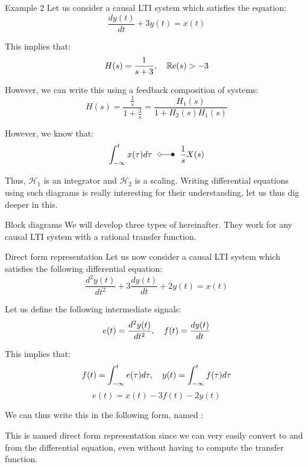 \documentclass[a4paper]{article}
\begin{document}
\begin{parag}{Example 2}
    Let us consider a causal LTI system which satisfies the equation: 
    \[\frac{dy\left(t\right)}{dt} + 3y\left(t\right) = x\left(t\right)\]
    
    This implies that: 
    \[H\left(s\right) = \frac{1}{s+3}, \mathspace \cre\left(s\right) > -3\]
    
    However, we can write this using a feedback composition of systems: 
    \[H\left(s\right) = \frac{\frac{1}{s}}{1 + \frac{3}{s}} = \frac{H_1\left(s\right)}{1 + H_2\left(s\right)H_1\left(s\right)}\]
    

    However, we know that: 
    \[\int_{-\infty}^{t} x\left(\tau\right)d\tau \laplacepair \frac{1}{s}X\left(s\right)\]
    
    Thus, $\mathcal{H}_1$ is an integrator and $\mathcal{H}_2$ is a scaling. Writing differential equations using such diagrams is really interesting for their understanding, let us thus dig deeper in this.
\end{parag}

\begin{parag}{Block diagrams}
    We will develop three types of  hereinafter. They work for any causal LTI system with a rational transfer function.
\end{parag}

\begin{parag}{Direct form representation}
    Let us now consider a causal LTI system which satisfies the following differential equation: 
    \[\frac{d^2 y\left(t\right)}{dt^2} + 3\frac{dy\left(t\right)}{dt} + 2y\left(t\right) = x\left(t\right)\]
    
    Let us define the following intermediate signals:
    \[e\left(t\right) = \frac{d^2 y\left(t\right)}{dt^2}, \mathspace f\left(t\right) = \frac{dy\left(t\right)}{dt}\]
    
    This implies that:
    \[f\left(t\right) = \int_{-\infty}^{t} e\left(\tau\right)d\tau, \mathspace y\left(t\right) = \int_{-\infty}^{t} f\left(\tau\right)d\tau\]
    \[e\left(t\right) = x\left(t\right) - 3 f\left(t\right) -2 y\left(t\right)\]

    We can thus write this in the following form, named :

    This is named direct form representation since we can very easily convert to and from the differential equation, even without having to compute the transfer function.
\end{parag}
\end{document}
